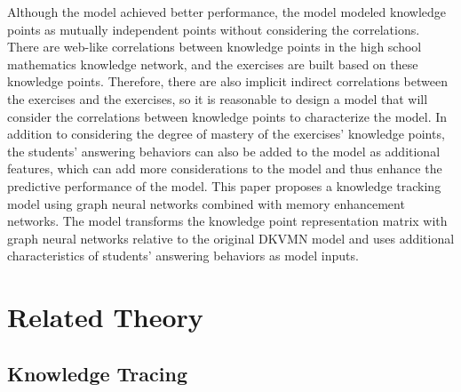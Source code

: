 Although the model achieved better performance, the model modeled knowledge points as mutually independent points without considering the correlations. There are web-like correlations between knowledge points in the high school mathematics knowledge network, and the exercises are built based on these knowledge points. Therefore, there are also implicit indirect correlations between the exercises and the exercises, so it is reasonable  to design a model that will consider the correlations between knowledge points to characterize the model. In addition to considering the degree of mastery of the exercises' knowledge points, the students' answering behaviors can also be added to the model as additional features, which can add more considerations to the model and thus enhance the predictive performance of the model. This paper proposes a knowledge tracking model using graph neural networks combined with memory enhancement networks. The model transforms the knowledge point representation matrix with graph neural networks relative to the original DKVMN model and uses additional characteristics of students' answering behaviors as model inputs.


\section{Related Theory}
\subsection{Knowledge Tracing}


